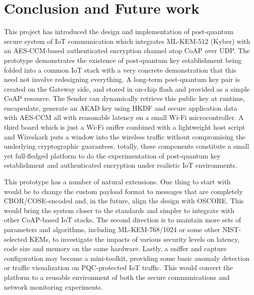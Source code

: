 \documentclass[USenglish,oneside,twocolumn]{article}
\begin{document}
    \section{Conclusion and Future work}
    This project has introduced the design and implementation of post-quantum secure system of IoT communication which integrates ML-KEM-512 (Kyber) with an AES-CCM-based authenticated encryption channel atop CoAP over UDP. The prototype demonstrates the existence of post-quantum key establishment being folded into a common IoT stack with a very concrete demonstration that this need not involve redesigning everything. A long-term post-quantum key pair is created on the Gateway side, and stored in on-chip flash and provided as a simple CoAP resource. The Sender can dynamically retrieve this public key at runtime, encapsulate, generate an AEAD key using HKDF and secure application data with AES-CCM all with reasonable latency on a small Wi-Fi microcontroller. A third board which is just a Wi-Fi sniffer combined with a lightweight host script and Wireshark puts a window into the wireless traffic without compromising the underlying cryptographic guarantees. totally, these components constitute a small yet full-fledged platform to do the experimentation of post-quantum key establishment and authenticated encryption under realistic IoT environments.

    This prototype has a number of natural extensions. One thing to start with would be to change the custom payload format to messages that are completely CBOR/COSE-encoded and, in the future, align the design with OSCORE. This would bring the system closer to the standards and simpler to integrate with other CoAP-based IoT stacks. The second direction is to maintain more sets of parameters and algorithms, including ML-KEM-768/1024 or some other NIST-selected KEMs, to investigate the impacts of various security levels on latency, code size and memory on the same hardware. Lastly, a sniffer and capture configuration may become a mini-toolkit, providing some basic anomaly detection or traffic visualization on PQC-protected IoT traffic. This would convert the platform to a reusable environment of both the secure communications and network monitoring experiments.
	
	\printbibliography[title={References}]
\end{document}
